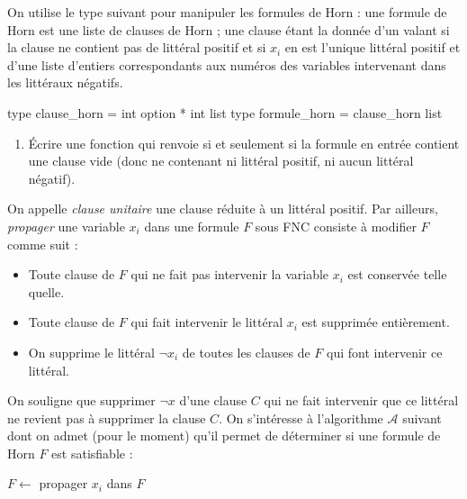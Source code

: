\documentclass{ccinp}
\begin{document}
On utilise le type suivant pour manipuler les formules de Horn : une formule de Horn est une liste de clauses de Horn ; une clause étant la donnée d'un  valant  si la clause ne contient pas de littéral positif et  si $x_i$ en est l'unique littéral positif et d'une liste d'entiers correspondants aux numéros des variables intervenant dans les littéraux négatifs.

\begin{ocode}
   type clause_horn = int option * int list
   type formule_horn = clause_horn list
\end{ocode}

\begin{enumerate}[resume]
  \item \'Ecrire une fonction  qui renvoie  si et seulement si la formule en entrée contient une clause vide (donc ne contenant ni littéral positif, ni aucun littéral négatif).
\end{enumerate}
        

On appelle \textit{clause unitaire} une clause réduite à un littéral positif. Par ailleurs, \textit{propager} une variable $x_i$ dans une formule $F$ sous FNC consiste à modifier $F$ comme suit : \begin{itemize}
    \item Toute clause de $F$ qui ne fait pas intervenir la variable $x_i$ est conservée telle quelle.
    \item Toute clause de $F$ qui fait intervenir le littéral $x_i$ est supprimée entièrement.
    \item On supprime le littéral $\neg x_i$ de toutes les clauses de $F$ qui font intervenir ce littéral.
\end{itemize}

On souligne que supprimer $\neg x$ d'une clause $C$ qui ne fait intervenir que ce littéral ne revient pas à supprimer la clause $C$. On s'intéresse à l'algorithme $\mathcal{A}$ suivant dont on admet (pour le moment) qu'il permet de déterminer si une formule de Horn $F$ est satisfiable : \begin{center}
\begin{minipage}{11cm}
  \begin{pcode-nl-env}
    {
      $F \leftarrow$ propager $x_i$ dans $F$ \;
    }
    {
       \;
    }
    \Else
    {
       \;
    } 
  \end{pcode-nl-env}  
\end{minipage}
\end{center}
\end{document}
